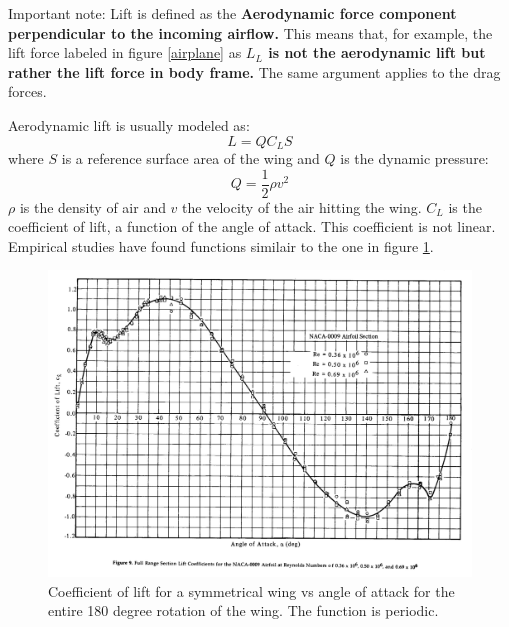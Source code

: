 Important note: Lift is defined as the \textbf{Aerodynamic force component perpendicular to the incoming airflow.} This means that, for example, the lift force labeled in figure \ref {airplane} as \textbf{$L_L$ is not the aerodynamic lift but rather the lift force in body frame.} The same argument applies to the drag forces.

Aerodynamic lift is usually modeled as\cite{nelson}\cite{aerodynamics}:
\begin{equation}
    L = Q  C_L S
\end{equation}
where $S$ is a reference surface area of the wing and $Q$ is the dynamic pressure:
\begin{equation}
    Q = \frac{1}{2} \rho v^2
\end{equation}
$\rho$ is the density of air and $v$ the velocity of the air hitting the wing.
$C_L$ is the coefficient of lift, a function of the angle of attack.
This coefficient is not linear. Empirical studies\cite{aoa180}\cite{aoa180-2} have found functions similair to the one in figure \ref{clalpha}.
\begin{figure}[h]
    \center
    \includegraphics[scale=0.15]{aoa_80s.png}
    \caption{Coefficient of lift for a symmetrical wing vs angle of attack for the entire 180 degree rotation of the wing. The function is periodic.}
    \label{clalpha}
\end{figure}


